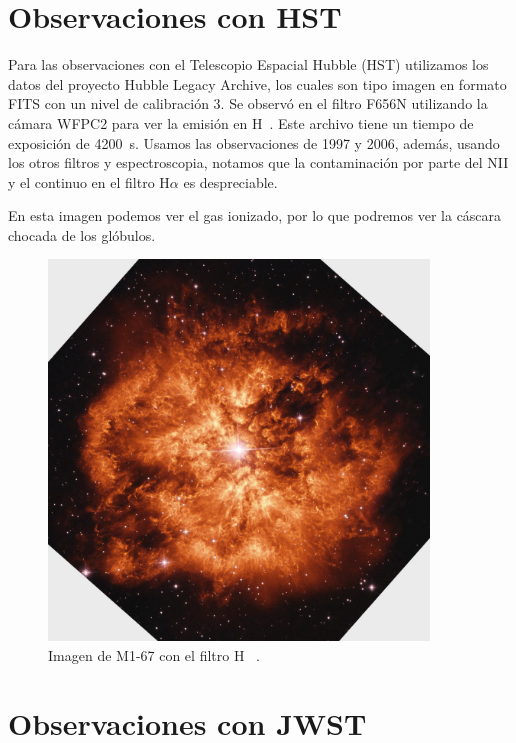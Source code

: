 \documentclass{book}
\begin{document}
\section{Observaciones con HST}

Para las observaciones con el Telescopio Espacial Hubble (HST) utilizamos los datos del proyecto Hubble Legacy Archive, los cuales son tipo imagen en formato FITS con un nivel de calibración 3.  Se observó en el filtro F656N utilizando la cámara WFPC2 para ver la emisión en \unit{H\alpha}. Este archivo tiene un tiempo de exposición de \SI{4200}{s}. Usamos las observaciones de 1997 y 2006, además, usando los otros filtros y espectroscopia, notamos que la contaminación por parte del NII y el continuo en el filtro H$\alpha$ es despreciable.

En esta imagen podemos ver el gas ionizado, por lo que podremos ver la cáscara chocada de los glóbulos.

\begin{figure}[htb]
    \centering
    \includegraphics[width=0.9\textwidth]{m1-67-comp-full-hst.jpg}
    \caption{Imagen de M1-67 con el filtro \unit{H\alpha} \citep{Grosdidier:1998}.}
    \label{fig:M1-67HST}
\end{figure}

\section{Observaciones con JWST}
\end{document}
